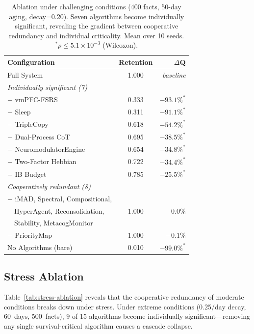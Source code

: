 \documentclass{article}
\begin{document}
\begin{table}[h]
    \caption{Ablation under challenging conditions (400 facts, 50-day aging,
    decay=0.20). Seven algorithms become individually significant,
    revealing the gradient between cooperative redundancy and individual
    criticality. Mean over 10 seeds. $^\ast p \le 5.1\times 10^{-3}$ (Wilcoxon).}
    \label{tab:challenging-ablation}
    \centering
    \small
    \begin{tabular}{lcr}
        \toprule
        Configuration & Retention & $\Delta$Q \\
        \midrule
        Full System & 1.000 & \emph{baseline} \\
        \midrule
        \multicolumn{3}{l}{\textit{Individually significant (7)}} \\
        $-$ vmPFC-FSRS & 0.333 & $-93.1\%^\ast$ \\
        $-$ Sleep & 0.311 & $-91.1\%^\ast$ \\
        $-$ TripleCopy & 0.618 & $-54.2\%^\ast$ \\
        $-$ Dual-Process CoT & 0.695 & $-38.5\%^\ast$ \\
        $-$ NeuromodulatorEngine & 0.654 & $-34.8\%^\ast$ \\
        $-$ Two-Factor Hebbian & 0.722 & $-34.4\%^\ast$ \\
        $-$ IB Budget & 0.785 & $-25.5\%^\ast$ \\
        \midrule
        \multicolumn{3}{l}{\textit{Cooperatively redundant (8)}} \\
        $-$ iMAD, Spectral, Compositional, & & \\
        ~~HyperAgent, Reconsolidation, & \multirow{-2}{*}{1.000} & \multirow{-2}{*}{$0.0\%$} \\
        ~~Stability, MetacogMonitor & & \\
        $-$ PriorityMap & 1.000 & $-0.1\%$ \\
        \midrule
        No Algorithms (bare) & 0.010 & $-99.0\%^\ast$ \\
        \bottomrule
    \end{tabular}
\end{table}

\subsection{Stress Ablation}

Table~\ref{tab:stress-ablation} reveals that the cooperative redundancy
of moderate conditions breaks down under stress.
Under extreme conditions (0.25/day decay, 60~days, 500~facts), 9 of 15
algorithms become individually significant---removing any single
survival-critical algorithm causes a cascade collapse.
\end{document}
